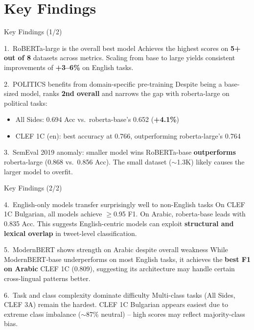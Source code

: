 \documentclass[aspectratio=169]{beamer}
\begin{document}
\section{Key Findings}

\begin{frame}{Key Findings (1/2)}
  \begin{block}{1.\ RoBERTa-large is the overall best model}
    Achieves the highest scores on \textbf{5+ out of 8} datasets across metrics. Scaling from base to large yields consistent improvements of \textbf{+3--6\%} on English tasks.
  \end{block}

  \begin{block}{2.\ POLITICS benefits from domain-specific pre-training}
    Despite being a base-sized model, ranks \textbf{2nd overall} and narrows the gap with roberta-large on political tasks:
    \begin{itemize}
      \item All Sides: 0.694 Acc vs.\ roberta-base's 0.652 (\textbf{+4.1\%})
      \item CLEF 1C (en): best accuracy at 0.766, outperforming roberta-large's 0.764
    \end{itemize}
  \end{block}

  \begin{block}{3.\ SemEval 2019 anomaly: smaller model wins}
    RoBERTa-base \textbf{outperforms} roberta-large (0.868 vs.\ 0.856 Acc). The small dataset ($\sim$1.3K) likely causes the larger model to overfit.
  \end{block}
\end{frame}

\begin{frame}{Key Findings (2/2)}
  \begin{block}{4.\ English-only models transfer surprisingly well to non-English tasks}
    On CLEF 1C Bulgarian, all models achieve $\geq$0.95 F1. On Arabic, roberta-base leads with 0.835 Acc. This suggests English-centric models can exploit \textbf{structural and lexical overlap} in tweet-level classification.
  \end{block}

  \begin{block}{5.\ ModernBERT shows strength on Arabic despite overall weakness}
    While ModernBERT-base underperforms on most English tasks, it achieves the \textbf{best F1 on Arabic} CLEF 1C (0.809), suggesting its architecture may handle certain cross-lingual patterns better.
  \end{block}

  \begin{block}{6.\ Task and class complexity dominate difficulty}
    Multi-class tasks (All Sides, CLEF 3A) remain the hardest. CLEF 1C Bulgarian appears easiest due to extreme class imbalance ($\sim$87\% neutral) -- high scores may reflect majority-class bias.
  \end{block}
\end{frame}
\end{document}
